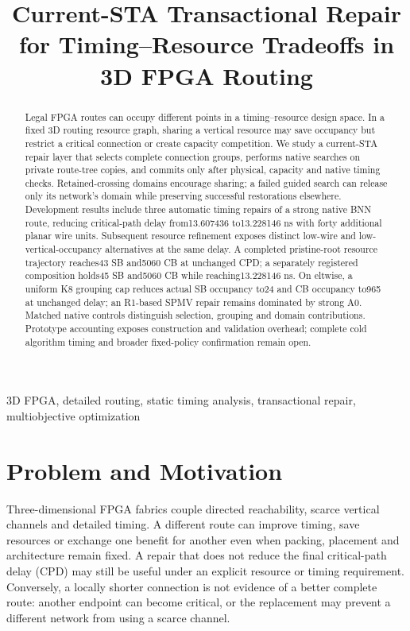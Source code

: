 \documentclass[conference,10pt]{IEEEtran}
\title{Current-STA Transactional Repair for Timing--Resource Tradeoffs in 3D FPGA Routing}
\author{\IEEEauthorblockN{Anonymous development manuscript}}
\begin{document}
\maketitle
\begin{abstract}
Legal FPGA routes can occupy different points in a timing--resource design space. In a fixed 3D routing resource graph, sharing a vertical resource may save occupancy but restrict a critical connection or create capacity competition. We study a current-STA repair layer that selects complete connection groups, performs native searches on private route-tree copies, and commits only after physical, capacity and native timing checks. Retained-crossing domains encourage sharing; a failed guided search can release only its network's domain while preserving successful restorations elsewhere. Development results include three automatic timing repairs of a strong native BNN route, reducing critical-path delay from13.607436 to13.228146 ns with forty additional planar wire units. Subsequent resource refinement exposes distinct low-wire and low-vertical-occupancy alternatives at the same delay. A completed pristine-root resource trajectory reaches43 SB and5060 CB at unchanged CPD; a separately registered composition holds45 SB and5060 CB while reaching13.228146 ns. On eltwise, a uniform K8 grouping cap reduces actual SB occupancy to24 and CB occupancy to965 at unchanged delay; an R1-based SPMV repair remains dominated by strong A0. Matched native controls distinguish selection, grouping and domain contributions. Prototype accounting exposes construction and validation overhead; complete cold algorithm timing and broader fixed-policy confirmation remain open.
\end{abstract}
\begin{IEEEkeywords}
3D FPGA, detailed routing, static timing analysis, transactional repair, multiobjective optimization
\end{IEEEkeywords}

\section{Problem and Motivation}
Three-dimensional FPGA fabrics couple directed reachability, scarce vertical channels and detailed timing. A different route can improve timing, save resources or exchange one benefit for another even when packing, placement and architecture remain fixed. A repair that does not reduce the final critical-path delay (CPD) may still be useful under an explicit resource or timing requirement. Conversely, a locally shorter connection is not evidence of a better complete route: another endpoint can become critical, or the replacement may prevent a different network from using a scarce channel.
\end{document}
